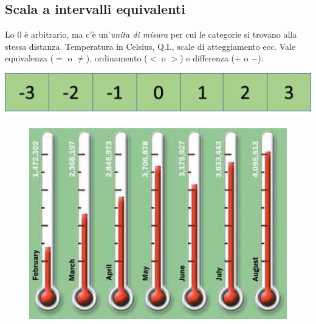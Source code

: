 \documentclass[compress]{beamer}
\begin{document}
\subsection{Scala a intervalli equivalenti}
\begin{frame}
	
	Lo $0$ è arbitrario, ma c'è un'\emph{unita di misura} per cui le categorie si trovano alla stessa distanza. Temperatura in Celsius, Q.I., scale di atteggiamento ecc. Vale equivalenza ($=$ o $\neq$), ordinamento ($<$ o $>$) e differenza ($+$ o $-$): 
	\begin{center}
		\includegraphics[width=0.5\linewidth]{intervalli.png}
	\end{center}
	
	\begin{figure}
		\centering
		\includegraphics[width=0.8\linewidth]{termometroMulti.jpg}
	\end{figure}
	
\end{frame}
\end{document}
